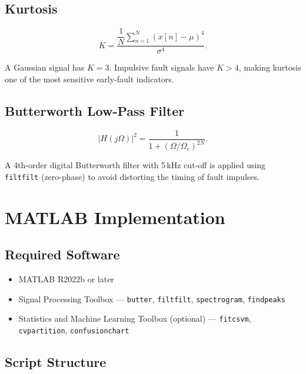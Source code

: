 \documentclass[12pt,a4paper]{article}
\begin{document}
\subsection{Kurtosis}

\begin{equation}
  K = \frac{\dfrac{1}{N}\displaystyle\sum_{n=1}^{N}
      (x[n]-\mu)^4}{\sigma^4}.
  \label{eq:kurt}
\end{equation}

A Gaussian signal has $K = 3$. Impulsive fault signals have
$K > 4$, making kurtosis one of the most sensitive early-fault
indicators.

\subsection{Butterworth Low-Pass Filter}

\begin{equation}
  |H(j\Omega)|^2 = \frac{1}{1 + (\Omega/\Omega_c)^{2N}}.
  \label{eq:butter}
\end{equation}

A 4th-order digital Butterworth filter with 5\,kHz cut-off is
applied using \texttt{filtfilt} (zero-phase) to avoid distorting
the timing of fault impulses.

\section{MATLAB Implementation}

\subsection{Required Software}

\begin{itemize}
  \item MATLAB R2022b or later
  \item Signal Processing Toolbox --- \texttt{butter}, \texttt{filtfilt},
        \texttt{spectrogram}, \texttt{findpeaks}
  \item Statistics and Machine Learning Toolbox (optional) ---
        \texttt{fitcsvm}, \texttt{cvpartition}, \texttt{confusionchart}
\end{itemize}

\subsection{Script Structure}
\end{document}
